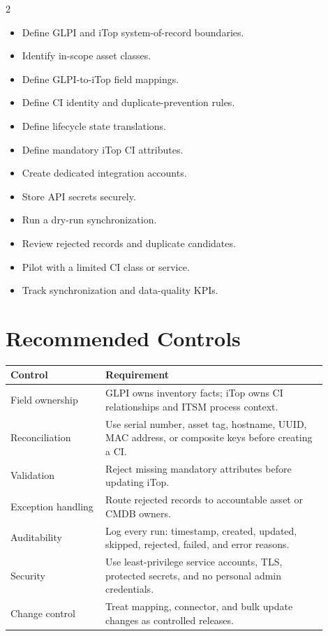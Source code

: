 \documentclass[11pt]{article}
\newcommand{\checkbox}{\fbox{\rule{0pt}{1.1ex}\rule{1.1ex}{0pt}}}
\begin{document}
\begin{multicols}{2}
\begin{itemize}
  \item[\checkbox] Define GLPI and iTop system-of-record boundaries.
  \item[\checkbox] Identify in-scope asset classes.
  \item[\checkbox] Define GLPI-to-iTop field mappings.
  \item[\checkbox] Define CI identity and duplicate-prevention rules.
  \item[\checkbox] Define lifecycle state translations.
  \item[\checkbox] Define mandatory iTop CI attributes.
  \item[\checkbox] Create dedicated integration accounts.
  \item[\checkbox] Store API secrets securely.
  \item[\checkbox] Run a dry-run synchronization.
  \item[\checkbox] Review rejected records and duplicate candidates.
  \item[\checkbox] Pilot with a limited CI class or service.
  \item[\checkbox] Track synchronization and data-quality KPIs.
\end{itemize}
\end{multicols}

\section{Recommended Controls}

\begin{longtable}{p{0.27\linewidth}p{0.63\linewidth}}
\toprule
\rowcolor{LightBlue}\textbf{Control} & \textbf{Requirement} \\
\midrule
Field ownership & GLPI owns inventory facts; iTop owns CI relationships and ITSM process context. \\
Reconciliation & Use serial number, asset tag, hostname, UUID, MAC address, or composite keys before creating a CI. \\
Validation & Reject missing mandatory attributes before updating iTop. \\
Exception handling & Route rejected records to accountable asset or CMDB owners. \\
Auditability & Log every run: timestamp, created, updated, skipped, rejected, failed, and error reasons. \\
Security & Use least-privilege service accounts, TLS, protected secrets, and no personal admin credentials. \\
Change control & Treat mapping, connector, and bulk update changes as controlled releases. \\
\bottomrule
\end{longtable}
\end{document}
